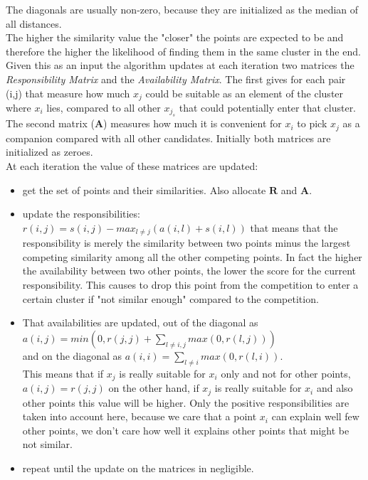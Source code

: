 The diagonals are usually non-zero, because they are initialized as the median of all distances.\\
The higher the similarity value the "closer" the points are expected to be and therefore the higher the likelihood of finding them in the same cluster in the end.\\
Given this as an input the algorithm updates at each iteration two matrices the \textit{Responsibility Matrix} and the \textit{Availability Matrix}. The first gives for each pair (i,j) that measure how much $x_j$ could be suitable as an element of the cluster where $x_i$ lies, compared to all other $x_{j_s}$ that could potentially enter that cluster. The second matrix ($\mathbf{A}$) measures how much it is convenient for $x_i$ to pick $x_j$ as a companion compared with all other candidates. Initially both matrices are initialized as zeroes.\\
At each iteration the value of these matrices are updated:
\begin{itemize}
	\item get the set of points and their similarities. Also allocate $\mathbf{R}$ and $\mathbf{A}$.
	\item update the responsibilities: $r(i,j) = s(i,j) - max_{l \neq j}\left(a(i,l) + s(i,l)\right)$ that means that the responsibility is merely the similarity between two points minus the largest competing similarity among all the other competing points. In fact the higher the availability between two other points, the lower the score for the current responsibility. This causes to drop this point from the competition to enter a certain cluster if "not similar enough" compared to the competition.\\
	\item That availabilities are updated, out of the diagonal as\\
	$a(i,j) = min \left(0, r(j,j) + \sum_{l \neq i,j}max(0, r(l,j))\right)$\\ 
	and on the diagonal as $a(i,i) = \sum_{l \neq i}max(0, r(l,i))$.\\
	This means that if $x_j$ is really suitable for $x_i$ only and not for other points, $a(i,j) = r(j,j)$ on the other hand, if $x_j$ is really suitable for $x_i$ and also other points this value will be higher. Only the positive responsibilities are taken into account here, because we care that a point $x_i$ can explain well few other points, we don't care how well it explains other points that might be not similar.
	\item repeat until the update on the matrices in negligible.
\end{itemize}

